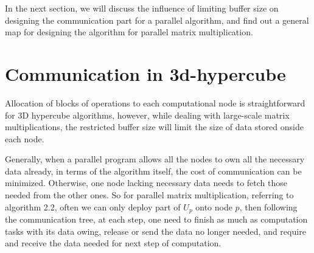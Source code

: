 \documentclass{amsart}
\theoremstyle{definition}
\theoremstyle{remark}
\numberwithin{equation}{section}
\begin{document}
	In the next section, we will discuss the influence of limiting buffer size on designing the communication part for a parallel algorithm, and find out a general map for designing the algorithm for parallel matrix multiplication.\par


\section{Communication in 3d-hypercube}
	Allocation of blocks of operations to each computational node is straightforward for 3D hypercube algorithms, however, while dealing with large-scale matrix multiplications, the restricted buffer size will limit the size of data stored onside each node.\par
	Generally, when a parallel program allows all the nodes to own all the necessary data already, in terms of the algorithm itself, the cost of communication can be minimized. Otherwise, one node lacking necessary data needs to fetch those needed from the other ones. So for parallel matrix multiplication, referring to algorithm 2.2, often we can only deploy part of $U_p$ onto node $p$, then following the communication tree, at each step, one need to finish as much as computation tasks with its data owing, release or send the data no longer needed, and require and receive the data needed for next step of computation.\par


\end{document}
